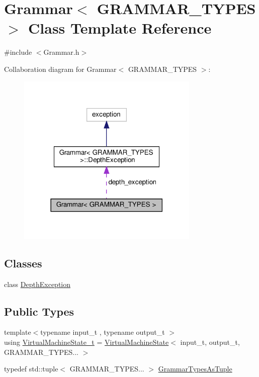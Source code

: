 \hypertarget{class_grammar}{}\section{Grammar$<$ G\+R\+A\+M\+M\+A\+R\+\_\+\+T\+Y\+P\+ES $>$ Class Template Reference}
\label{class_grammar}


{\ttfamily \#include $<$Grammar.\+h$>$}



Collaboration diagram for Grammar$<$ G\+R\+A\+M\+M\+A\+R\+\_\+\+T\+Y\+P\+ES $>$\+:
\nopagebreak
\begin{figure}[H]
\begin{center}
\leavevmode
\includegraphics[width=246pt]{class_grammar__coll__graph}
\end{center}
\end{figure}
\subsection*{Classes}
\begin{DoxyCompactItemize}
\item 
class \hyperlink{class_grammar_1_1_depth_exception}{Depth\+Exception}
\end{DoxyCompactItemize}
\subsection*{Public Types}
\begin{DoxyCompactItemize}
\item 
{\footnotesize template$<$typename input\+\_\+t , typename output\+\_\+t $>$ }\\using \hyperlink{class_grammar_a30c2eaa4b378738686365fc6d8697f61}{Virtual\+Machine\+State\+\_\+t} = \hyperlink{class_virtual_machine_state}{Virtual\+Machine\+State}$<$ input\+\_\+t, output\+\_\+t, G\+R\+A\+M\+M\+A\+R\+\_\+\+T\+Y\+P\+E\+S... $>$
\item 
typedef std\+::tuple$<$ G\+R\+A\+M\+M\+A\+R\+\_\+\+T\+Y\+P\+E\+S... $>$ \hyperlink{class_grammar_a5ba44586d1c6f847cbbeeead91964e3c}{Grammar\+Types\+As\+Tuple}
\end{DoxyCompactItemize}
